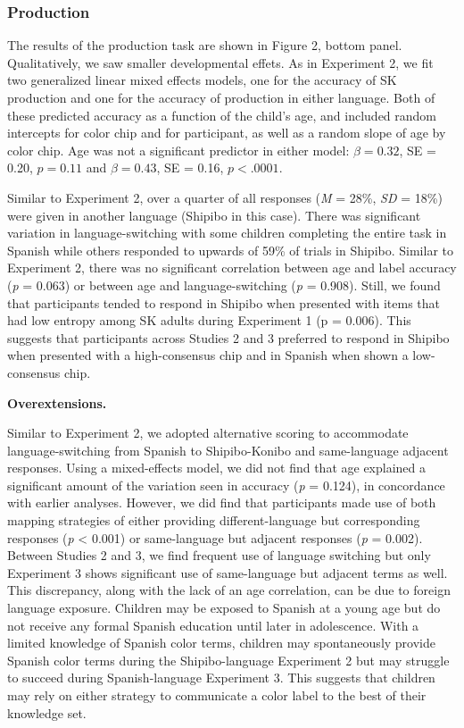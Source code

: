 \documentclass[floatsintext,man]{apa6}
\theoremstyle{definition}
\theoremstyle{definition}
\theoremstyle{definition}
\theoremstyle{remark}
\begin{document}
\subsubsection{Production}\label{production-1}

The results of the production task are shown in Figure 2, bottom panel.
Qualitatively, we saw smaller developmental effets. As in Experiment 2,
we fit two generalized linear mixed effects models, one for the accuracy
of SK production and one for the accuracy of production in either
language. Both of these predicted accuracy as a function of the child's
age, and included random intercepts for color chip and for participant,
as well as a random slope of age by color chip. Age was not a
significant predictor in either model: \(\beta = 0.32\), SE = 0.20,
\(p = 0.11\) and \(\beta = 0.43\), SE = 0.16, \(p < .0001\).

Similar to Experiment 2, over a quarter of all responses (\emph{M} =
28\%, \emph{SD} = 18\%) were given in another language (Shipibo in this
case). There was significant variation in language-switching with some
children completing the entire task in Spanish while others responded to
upwards of 59\% of trials in Shipibo. Similar to Experiment 2, there was
no significant correlation between age and label accuracy (\emph{p} =
0.063) or between age and language-switching (\emph{p} = 0.908). Still,
we found that participants tended to respond in Shipibo when presented
with items that had low entropy among SK adults during Experiment 1 (p =
0.006). This suggests that participants across Studies 2 and 3 preferred
to respond in Shipibo when presented with a high-consensus chip and in
Spanish when shown a low-consensus chip.

\textbf{Overextensions.}

Similar to Experiment 2, we adopted alternative scoring to accommodate
language-switching from Spanish to Shipibo-Konibo and same-language
adjacent responses. Using a mixed-effects model, we did not find that
age explained a significant amount of the variation seen in accuracy
(\emph{p} = 0.124), in concordance with earlier analyses. However, we
did find that participants made use of both mapping strategies of either
providing different-language but corresponding responses (\emph{p}
\textless{} 0.001) or same-language but adjacent responses (\emph{p} =
0.002). Between Studies 2 and 3, we find frequent use of language
switching but only Experiment 3 shows significant use of same-language
but adjacent terms as well. This discrepancy, along with the lack of an
age correlation, can be due to foreign language exposure. Children may
be exposed to Spanish at a young age but do not receive any formal
Spanish education until later in adolescence. With a limited knowledge
of Spanish color terms, children may spontaneously provide Spanish color
terms during the Shipibo-language Experiment 2 but may struggle to
succeed during Spanish-language Experiment 3. This suggests that
children may rely on either strategy to communicate a color label to the
best of their knowledge set.
\end{document}
